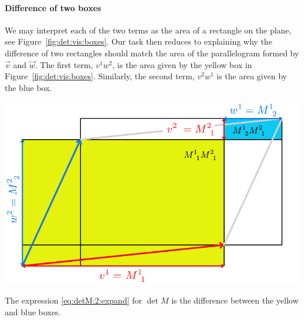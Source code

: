 \paragraph{Difference of two boxes} We may interpret each of the two terms as the area of a rectangle on the plane, see Figure~\ref{fig:det:vis:boxes}. Our task then reduces to explaining why the difference of two rectangles should match the area of the parallelogram formed by $\vec{v}$ and $\vec{w}$. The first term, $v^1w^2$, is the area given by the yellow box in Figure~\ref{fig:det:vis:boxes}. Similarly, the second term, $v^2w^1$ is the area given by the blue box.
\begin{marginfigure}%
    \includegraphics[width=\textwidth]{figures/det TwoPiecesofDet.pdf}
    \caption{The expression \eqref{eq:detM:2:expand} for $\det M$ is the difference between the yellow and blue boxes.}
        \label{fig:det:vis:boxes}
\end{marginfigure}

